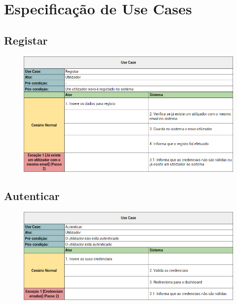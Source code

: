 \documentclass[a4paper]{report}
\begin{document}
\chapter{Especificação de Use Cases}
    \section{Registar}
        \begin{figure}[H]
        \centering
            \includegraphics[width=\textwidth]{images/usecases/registar.png}
        \end{figure}

    \section{Autenticar}
        \begin{figure}[H]
        \centering
            \includegraphics[width=\textwidth]{images/usecases/autenticar.png}
        \end{figure}
\end{document}
